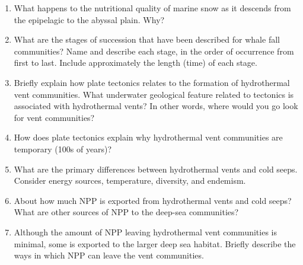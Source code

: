 \documentclass[nofonts, letterpaper]{tufte-handout}
\begin{document}
\begin{enumerate}

\item
  What happens to the nutritional quality of marine snow as it descends
  from the epipelagic to the abyssal plain. Why?

\item
  What are the stages of succession that have been described for whale
  fall communities? Name and describe each stage, in the order of
  occurrence from first to last. Include approximately the length (time) of each stage.

\item
  Briefly explain how plate tectonics relates to the formation of
  hydrothermal vent communities. What underwater geological feature
  related to tectonics is associated with hydrothermal vents? In other words,
  where would you go look for vent communities?
  
\item 
  How does plate tectonics explain why
  hydrothermal vent communities are temporary (100s of years)?
  
\item
  What are the primary differences between hydrothermal vents and cold
  seeps. Consider energy sources, temperature, diversity, and endemism.


\item
  About how much NPP is exported from hydrothermal vents and cold seeps?
  What are other sources of NPP to the deep-sea communities?

\item
  Although the amount of NPP leaving hydrothermal vent communities is
  minimal, some is exported to the larger deep sea habitat. Briefly
  describe the ways in which NPP can leave the vent communities.
  

\end{enumerate}
\end{document}
